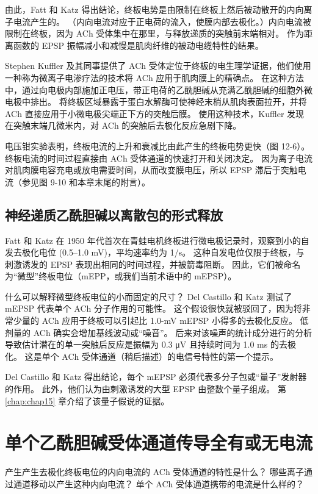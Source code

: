 由此，Fatt 和 Katz 得出结论，终板电势是由限制在终板上然后被动散开的内向离子电流产生的。 
（内向电流对应于正电荷的流入，使膜内部去极化。）内向电流被限制在终板，因为 ACh 受体集中在那里，与释放递质的突触前末端相对。 
作为距离函数的 EPSP 振幅减小和减慢是肌肉纤维的被动电缆特性的结果。


Stephen Kuffler 及其同事提供了 ACh 受体定位于终板的电生理学证据，他们使用一种称为微离子电渗疗法的技术将 ACh 应用于肌肉膜上的精确点。 
在这种方法中，通过向电极内部施加正电压，带正电荷的乙酰胆碱从充满乙酰胆碱的细胞外微电极中排出。 
将终板区域暴露于蛋白水解酶可使神经末梢从肌肉表面拉开，并将 ACh 直接应用于小微电极尖端正下方的突触后膜。 使用这种技术，Kuffler 发现在突触末端几微米内，对 ACh 的突触后去极化反应急剧下降。


电压钳实验表明，终板电流的上升和衰减比由此产生的终板电势更快（图 12-6）。 
终板电流的时间过程直接由 ACh 受体通道的快速打开和关闭决定。 
因为离子电流对肌肉膜电容充电或放电需要时间，从而改变膜电压，所以 EPSP 滞后于突触电流（参见图 9-10 和本章末尾的附言）。



\subsection{神经递质乙酰胆碱以离散包的形式释放}

Fatt 和 Katz 在 1950 年代首次在青蛙电机终板进行微电极记录时，观察到小的自发去极化电位 (0.5–1.0 mV)，平均速率约为 1/s。 
这种自发电位仅限于终板，与刺激诱发的 EPSP 表现出相同的时间过程，并被箭毒阻断。 
因此，它们被命名为“微型”终板电位（mEPP，或我们当前术语中的 mEPSP）。


什么可以解释微型终板电位的小而固定的尺寸？ 
Del Castillo 和 Katz 测试了 mEPSP 代表单个 ACh 分子作用的可能性。 
这个假设很快就被驳回了，因为将非常少量的 ACh 应用于终板可以引起比 1.0-mV mEPSP 小得多的去极化反应。 
低剂量的 ACh 确实会增加基线波动或“噪音”。 
后来对该噪声的统计成分进行的分析导致估计潜在的单一突触后反应是振幅为 0.3 μV 且持续时间为 1.0 ms 的去极化。 
这是单个 ACh 受体通道（稍后描述）的电信号特性的第一个提示。


Del Castillo 和 Katz 得出结论，每个 mEPSP 必须代表多分子包或“量子”发射器的作用。 
此外，他们认为由刺激诱发的大型 EPSP 由整数个量子组成。 
第 \ref{chap:chap15} 章介绍了该量子假说的证据。


\section{单个乙酰胆碱受体通道传导全有或无电流}
产生产生去极化终板电位的内向电流的 ACh 受体通道的特性是什么？ 
哪些离子通过通道移动以产生这种内向电流？ 
单个 ACh 受体通道携带的电流是什么样的？


